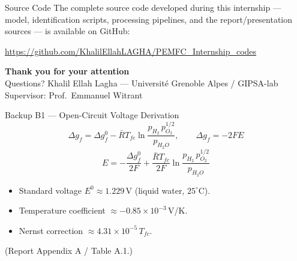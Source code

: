 \documentclass[aspectratio=169,11pt]{beamer}
\begin{document}
\begin{frame}{Source Code}
    \centering
    \vfill
    The complete source code developed during this internship --- model,
    identification scripts, processing pipelines, and the report/presentation
    sources --- is available on GitHub:
    \vspace{1.2em}

    {\large\url{https://github.com/KhalilEllahLAGHA/PEMFC_Internship_codes}}
    \vfill
\end{frame}

{
\begin{frame}[plain]
    \centering
    \vfill
    {\Huge \textcolor{ugablue}{\textbf{Thank you for your attention}}}\\[1em]
    {\Large Questions?}
    \vfill
    \footnotesize Khalil Ellah Lagha --- Universit\'e Grenoble Alpes / GIPSA-lab\\
    Supervisor: Prof.\ Emmanuel Witrant
    \vfill
\end{frame}
}

\appendix

\begin{frame}{Backup B1 --- Open-Circuit Voltage Derivation}
    \footnotesize
    \[
        \Delta g_f = \Delta g_f^{0} - \bar R T_{fc}\ln\!\frac{p_{H_2}\,p_{O_2}^{1/2}}{p_{H_2O}},
        \qquad \Delta g_f = -2FE
    \]
    \[
        E = -\frac{\Delta g_f^{0}}{2F} + \frac{\bar R T_{fc}}{2F}
            \ln\!\frac{p_{H_2}\,p_{O_2}^{1/2}}{p_{H_2O}}
    \]
    \begin{itemize}
        \item Standard voltage $E^{0}\approx 1.229$\,V (liquid water, $25^\circ$C).
        \item Temperature coefficient $\approx -0.85\times10^{-3}$\,V/K.
        \item Nernst correction $\approx 4.31\times10^{-5}\,T_{fc}$.
    \end{itemize}
    \scriptsize (Report Appendix A / Table A.1.)
\end{frame}
\end{document}
